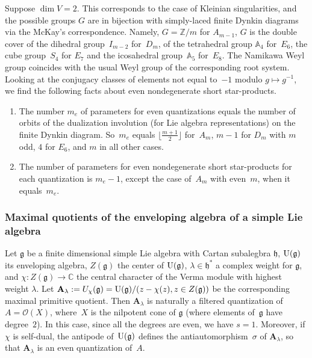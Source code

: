\documentclass[pdftex]{sigma}
\numberwithin{equation}{section}
\newcommand{\g}{\mathfrak{g}}
\newcommand{\h}{\mathfrak{h}}
\begin{document}
\begin{Example} Suppose $\dim V=2$. This corresponds to the case of Kleinian singularities,
and the possible groups $G$ are in bijection with simply-laced finite Dynkin diagrams
via the McKay's correspondence. Namely, $G={\mathbb Z}/m$ for $A_{m-1}$, $G$ is the double cover
of the dihedral group~$I_{m-2}$ for~$D_m$, of the tetrahedral group ${\mathbb A}_4$ for~$E_6$, the cube group~$S_4$ for $E_7$ and the icosahedral group~${\mathbb A}_5$ for~$E_8$. The Namikawa Weyl group coincides with the usual Weyl group of the corresponding root system. Looking at the conjugacy classes of elements not equal to~$-1$ modulo $g\mapsto g^{-1}$, we find the following facts about even nondegenerate short star-products.
\begin{enumerate}\itemsep=0pt
\item The number $m_e$ of parameters for even quantizations equals the number of orbits of the dualization involution (for Lie algebra representations) on the finite Dynkin diagram. So~$m_e$ equals $\big\lfloor\frac{m+1}{2}\big\rfloor$ for~$A_m$, $m-1$ for $D_m$ with $m$ odd, $4$ for $E_6$, and $m$ in all other cases.
\item The number of parameters for even nondegenerate short star-products for each quantization is $m_e-1$, except the case of~$A_m$ with even~$m$, when it equals~$m_e$.
\end{enumerate}
\end{Example}

\subsubsection{Maximal quotients of the enveloping algebra of a simple Lie algebra} \label{maxquot}

Let $\g$ be a finite dimensional simple Lie algebra with Cartan subalegbra $\h$, ${\rm U}(\g)$ its enveloping algebra, $Z(\g)$ the center of ${\rm U}(\g)$, $\lambda\in \h^*$ a complex weight for $\g$, and $\chi\colon Z(\g)\to {\mathbb C}$ the central character of the Verma module with highest weight $\lambda$. Let ${\mathbf A}_\lambda:=U_\chi(\g)={\rm U}(\g)/(z-\chi(z), z\in Z(\g))$ be the corresponding maximal primitive quotient. Then ${\mathbf A}_\lambda$ is naturally a filtered quantization of $A=\mathcal{O}(X)$, where~$X$ is the nilpotent cone of $\g$ (where elements of~$\g$ have degree~$2$). In this case, since all the degrees are even, we have $s=1$. Moreover, if $\chi$ is self-dual, the antipode of~${\rm U}(\g)$ defines the antiautomorphism~$\sigma$ of ${\mathbf A}_\lambda$, so that ${\mathbf A}_\lambda$ is an even quantization of~$A$.
\end{document}
